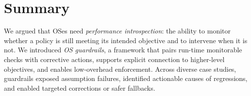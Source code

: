 \section{Summary}\label{sec:summary}

We argued that OSes need \emph{performance introspection}: the ability to monitor whether a policy is still meeting its intended objective and to intervene when it is not. We introduced \emph{OS guardrails}, a framework that pairs run-time monitorable checks with corrective actions, supports explicit connection to higher-level objectives, and enables low-overhead enforcement. Across diverse case studies, guardrails exposed assumption failures, identified actionable causes of regressions, and enabled targeted corrections or safer fallbacks.